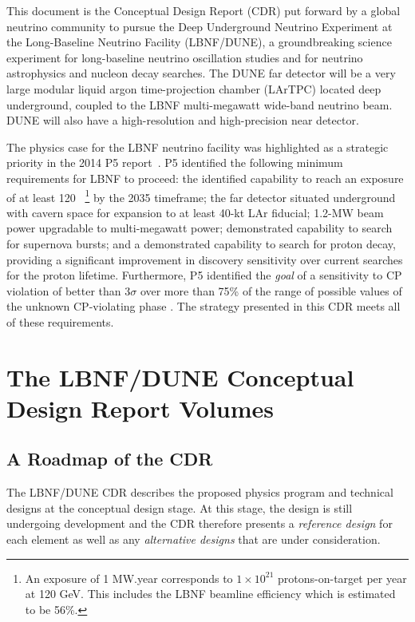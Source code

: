 This document is %
the Conceptual Design Report (CDR) put forward by a global neutrino community to pursue 
the Deep Underground Neutrino Experiment at the Long-Baseline Neutrino Facility (LBNF/DUNE),
a groundbreaking science experiment for long-baseline neutrino oscillation studies and for neutrino astrophysics and nucleon decay searches. The DUNE far detector will be a very large modular liquid argon time-projection chamber (LArTPC) located deep underground, coupled to the LBNF multi-megawatt  %
wide-band neutrino beam.   DUNE will also have a high-resolution and high-precision near detector.

The physics case for the LBNF neutrino facility was highlighted as a strategic priority in the 2014 P5 report~\cite{p5report2014}.
P5 identified the following minimum requirements for LBNF to proceed: 
the identified capability to reach an exposure of at least 120 \ktMWyr{}~\footnote{An exposure
of 1 MW.year corresponds to $1\times 10^{21}$ protons-on-target per year at 120 GeV. This includes the LBNF beamline efficiency which is estimated to be 56\%.}  by the 2035 timeframe;
the far detector situated underground with cavern space for expansion to at least 40-kt LAr fiducial;
1.2-MW beam power upgradable to multi-megawatt power;
demonstrated capability to search for supernova bursts; and
a demonstrated capability to search for proton decay, 
providing a significant improvement in discovery sensitivity over current searches for the proton lifetime.
Furthermore, P5 identified  the \textit{goal} of a sensitivity to CP violation of better than 3$\sigma$ over more than 75\% 
of the range of possible values of the unknown CP-violating phase \deltacp.
The strategy presented in this CDR meets all of these requirements.

\section{The LBNF/DUNE Conceptual Design Report Volumes}

\subsection{A Roadmap of the CDR}

The LBNF/DUNE CDR describes the proposed physics program and 
technical designs at the conceptual design stage.  At this stage, the design is
still undergoing development and the CDR therefore presents a \textit{reference design} for each element as well as any 
\textit{alternative designs} that are under consideration.

